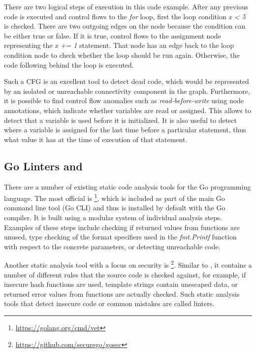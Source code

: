 

There are two logical steps of execution in this code example.
After any previous code is executed and control flows to the \textit{for} loop, first the loop condition \textit{x < 5}
is checked.
There are two outgoing edges on the node because the condition can be either true or false.
If it is true, control flows to the assignment node representing the \textit{x += 1} statement.
That node has an edge back to the loop condition node to check whether the loop should be run again.
Otherwise, the code following behind the loop is executed.

Such a \acrshort{CFG} is an excellent tool to detect dead code, which would be represented by an isolated or unreachable
connectivity component in the graph.
Furthermore, it is possible to find control flow anomalies such as \textit{read-before-write} using node annotations,
which indicate whether variables are read or assigned.
This allows to detect that a variable is used before it is initialized.
It is also useful to detect where a variable is assigned for the last time before a particular statement, thus what
value it has at the time of execution of that statement.



\subsection{Go Linters \toolVet{} and \toolGosec{}}\label{subsec:background:static-code-analysis:linters}

There are a number of existing static code analysis tools for the Go programming language.
The most official is \toolVet{}\footnote{\url{https://golang.org/cmd/vet}}, which is included as part of the main Go
command line tool (Go \acrshort{CLI}) and thus is installed by default with the Go compiler.
It is built using a modular system of individual analysis steps.
Examples of these steps include checking if returned values from functions are unused, type checking of the format
specifiers used in the \textit{fmt.Printf} function with respect to the concrete parameters, or detecting unreachable
code.

Another static analysis tool with a focus on security is \toolGosec{}\footnote{\url{https://github.com/securego/gosec}}.
Similar to \toolVet{}, it contains a number of different rules that the source code is checked against, for example, if
insecure hash functions are used, template strings contain unescaped data, or returned error values from functions are
actually checked.
Such static analysis tools that detect insecure code or common mistakes are called linters.

